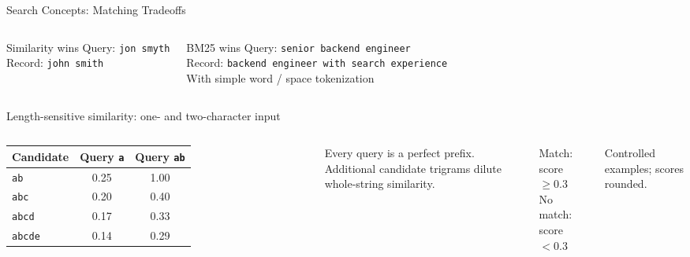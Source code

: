 \documentclass[aspectratio=169]{beamer}
\begin{document}
\begin{frame}{Search Concepts: Matching Tradeoffs}
  \begin{columns}[T,totalwidth=\textwidth]
      \begin{block}{Similarity wins}
        Query: \texttt{jon smyth}\\[0.15cm]
        Record: \texttt{john smith}
      \end{block}


      \begin{block}{BM25 wins}
        Query: \texttt{senior backend engineer}\\[0.15cm]
        Record: \texttt{backend engineer with search experience}
        \\[0.15cm]{\scriptsize With simple word / space tokenization}
      \end{block}

  \end{columns}
  \vspace{0.12cm}
  \begin{block}{Length-sensitive similarity: one- and two-character input}
  	  \vspace{0.12cm}
    \begin{columns}[T,totalwidth=0.96\textwidth]
        \footnotesize
        \begin{tabular}{lcc}
          Candidate & Query \texttt{a} & Query \texttt{ab} \\
          \midrule
          \texttt{ab}    & \textcolor{WarmAccent}{0.25} & \textcolor{SecondaryTeal}{1.00} \\
          \texttt{abc}   & \textcolor{WarmAccent}{0.20} & \textcolor{SecondaryTeal}{0.40} \\
          \texttt{abcd}  & \textcolor{WarmAccent}{0.17} & \textcolor{SecondaryTeal}{0.33} \\
          \texttt{abcde} & \textcolor{WarmAccent}{0.14} & \textcolor{WarmAccent}{0.29} \\
        \end{tabular}
        \small Every query is a perfect prefix. Additional candidate trigrams dilute whole-string similarity.
        \par\smallskip
        \scriptsize\textcolor{SecondaryTeal}{Match: score $\geq 0.3$}\\
        \textcolor{WarmAccent}{No match: score $< 0.3$}
        \par\smallskip
        \textcolor{MutedText}{Controlled examples; scores rounded.}
    \end{columns}
  \end{block}
\end{frame}
\end{document}
